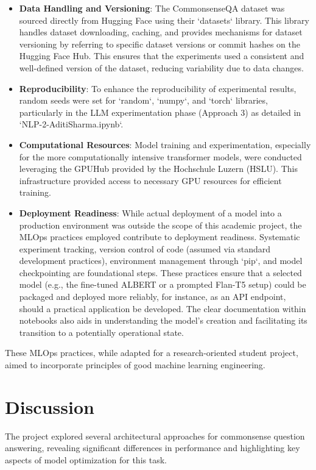 \documentclass[10.5pt]{article}
\begin{document}
\begin{itemize}
    \item \textbf{Data Handling and Versioning}: The CommonsenseQA dataset was sourced directly from Hugging Face using their `datasets` library. This library handles dataset downloading, caching, and provides mechanisms for dataset versioning by referring to specific dataset versions or commit hashes on the Hugging Face Hub. This ensures that the experiments used a consistent and well-defined version of the dataset, reducing variability due to data changes.
    \item \textbf{Reproducibility}: To enhance the reproducibility of experimental results, random seeds were set for `random`, `numpy`, and `torch` libraries, particularly in the LLM experimentation phase (Approach 3) as detailed in `NLP-2-AditiSharma.ipynb`.
    \item \textbf{Computational Resources}: Model training and experimentation, especially for the more computationally intensive transformer models, were conducted leveraging the GPUHub provided by the Hochschule Luzern (HSLU). This infrastructure provided access to necessary GPU resources for efficient training.
    \item \textbf{Deployment Readiness}: While actual deployment of a model into a production environment was outside the scope of this academic project, the MLOps practices employed contribute to deployment readiness. Systematic experiment tracking, version control of code (assumed via standard development practices), environment management through `pip`, and model checkpointing are foundational steps. These practices ensure that a selected model (e.g., the fine-tuned ALBERT or a prompted Flan-T5 setup) could be packaged and deployed more reliably, for instance, as an API endpoint, should a practical application be developed. The clear documentation within notebooks also aids in understanding the model's creation and facilitating its transition to a potentially operational state.
\end{itemize}
These MLOps practices, while adapted for a research-oriented student project, aimed to incorporate principles of good machine learning engineering.

\newpage
\section{Discussion}
The project explored several architectural approaches for commonsense question answering, revealing significant differences in performance and highlighting key aspects of model optimization for this task.
\end{document}
